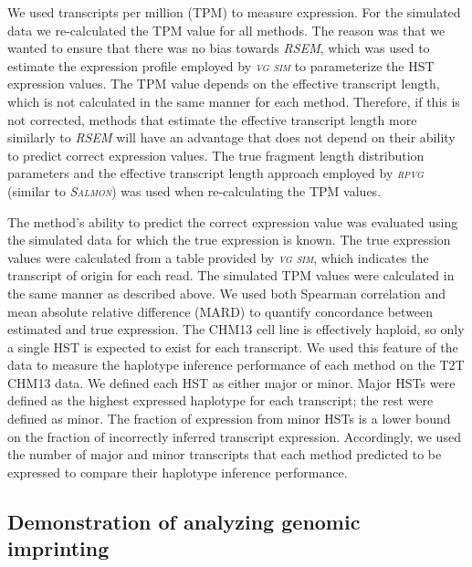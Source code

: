\documentclass[11pt]{ucthesis}
\newcommand{\tool}[1]{\emph{\textsc{#1}}}
\begin{document}
We used transcripts per million (TPM) to measure expression. For the simulated data we re-calculated the TPM value for all methods. The reason was that we wanted to ensure that there was no bias towards \tool{RSEM}, which was used to estimate the expression profile employed by \tool{vg sim} to parameterize the HST expression values. The TPM value depends on the effective transcript length, which is not calculated in the same manner for each method. Therefore, if this is not corrected, methods that estimate the effective transcript length more similarly to \tool{RSEM} will have an advantage that does not depend on their ability to predict correct expression values. The true fragment length distribution parameters and the effective transcript length approach employed by \tool{rpvg} (similar to \tool{Salmon}) was used when re-calculating the TPM values.

The method's ability to predict the correct expression value was evaluated using the simulated data for which the true expression is known. The true expression values were calculated from a table provided by \tool{vg sim}, which indicates the transcript of origin for each read. The simulated TPM values were calculated in the same manner as described above. We used both Spearman correlation and mean absolute relative difference (MARD) to quantify concordance between estimated and true expression. 
\newline 
\newline
The CHM13 cell line is effectively haploid, so only a single HST is expected to exist for each transcript. We used this feature of the data to measure the haplotype inference performance of each method on the T2T CHM13 data. We defined each HST as either major or minor. Major HSTs were defined as the highest expressed haplotype for each transcript; the rest were defined as minor. The fraction of expression from minor HSTs is a lower bound on the fraction of incorrectly inferred transcript expression. Accordingly, we used the number of major and minor transcripts that each method predicted to be expressed to compare their haplotype inference performance.

\subsection{Demonstration of analyzing genomic imprinting}
\end{document}
